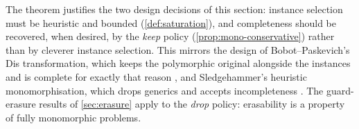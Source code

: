 \begin{remark}
The theorem justifies the two design decisions of this section:
instance selection must be heuristic and bounded
(\cref{def:saturation}), and completeness should be recovered, when
desired, by the \emph{keep} policy
(\cref{prop:mono-conservative}) rather than by cleverer instance
selection.  This mirrors the design of Bobot--Paskevich's
\textsf{Dis} transformation, which keeps the polymorphic original
alongside the instances and is complete for exactly that reason
\cite{BobotPaskevich2011}, and Sledgehammer's heuristic
monomorphisation, which drops generics and accepts incompleteness
\cite[\S5.6]{Blanchette2016}.  The guard-erasure results of
\cref{sec:erasure} apply to the \emph{drop} policy: erasability is a
property of fully monomorphic problems.
\end{remark}
